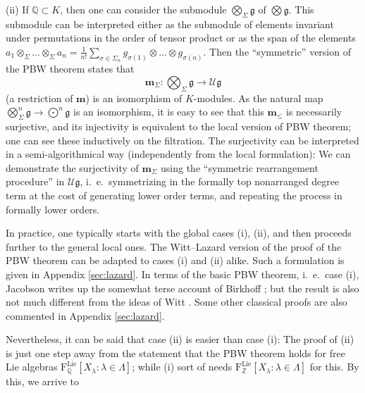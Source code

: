 \documentclass[11pt,a4paper]{amsart}
\DeclareMathOperator{\Lie}{Lie}
\newcommand{\bodot}{{\textstyle\bigodot}}
\theoremstyle{definition}
\theoremstyle{plain}
\begin{document}
(ii) If $\mathbb Q\subset K$, then one can consider the submodule $\bigotimes_\Sigma\mathfrak g$ of $\bigotimes\mathfrak g$.
This  submodule can be interpreted either as the submodule of elements invariant under permutations
 in the order of tensor product or as the span of the elements
 $a_1\otimes_\Sigma \ldots\otimes_\Sigma a_n=\frac1{n!}\sum_{\sigma\in\Sigma_n}g_{\sigma(1)}\otimes\ldots\otimes g_{\sigma(n)}$.
Then the ``symmetric'' version of the PBW theorem states that
\begin{equation*}\boldsymbol m_\Sigma:\textstyle{\bigotimes_\Sigma\mathfrak g}\rightarrow\mathcal U\mathfrak g\end{equation*}
 (a restriction of $\boldsymbol m$) is an isomorphism of $K$-modules.
As the natural map $\bigotimes_\Sigma^n\mathfrak g\rightarrow\bodot^n\mathfrak g$ is an isomorphism,
 it is easy to see that this $\boldsymbol m_\leq$ is necessarily surjective,
 and its injectivity is equivalent to the local version of PBW theorem;
 one can see these inductively on the filtration.
The surjectivity can be interpreted in a semi-algorithmical way (independently from the local formulation):
We can demonstrate the surjectivity of $\boldsymbol m_\Sigma$
 using the ``symmetric rearrangement procedure'' in $\mathcal U\mathfrak g$,
 i.~e.~symmetrizing in the formally top nonarranged degree term at the cost of generating lower order terms,
 and repeating the process in formally lower orders.


In practice, one typically starts with the global cases (i), (ii), and then proceeds further to the general local ones.
The Witt--Lazard version of the proof of the PBW theorem can be adapted to cases (i) and (ii) alike.
Such a formulation is given in Appendix \ref{sec:lazard}.
In terms of the basic PBW theorem, i.~e.~case (i), Jacobson \cite{J} writes up the somewhat terse account of Birkhoff \cite{B};
 but the result is also not much different from the ideas of Witt \cite{W}.
Some other classical proofs are also commented in Appendix \ref{sec:lazard}.

Nevertheless, it can be said  that case (ii) is easier than case (i):
The proof of  (ii) is just one step away from the statement that the PBW theorem holds
 for free Lie algebras $\mathrm F_{\mathbb Q}^{\Lie}[X_\lambda : \lambda\in\Lambda]$;
 while  (i) sort of needs $\mathrm F_{\mathbb Z}^{\Lie}[X_\lambda : \lambda\in\Lambda]$ for this.
By this, we arrive to
\end{document}
